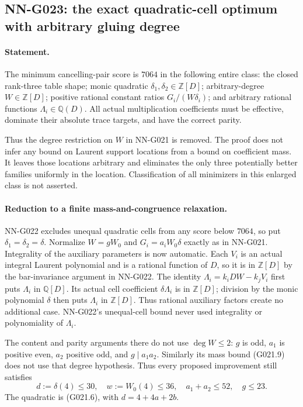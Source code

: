 \subsection{NN-G023: the exact quadratic-cell optimum with arbitrary gluing degree}
\paragraph{Statement.}
The minimum cancelling-pair score is $7064$ in the following
entire class: the closed rank-three table shape; monic quadratic
$\delta_1,\delta_2\in\mathbb Z[D]$; arbitrary-degree
$W\in\mathbb Z[D]$; positive rational constant ratios
$G_i/(W\delta_i)$; and arbitrary rational functions
$\Lambda_i\in\mathbb Q(D)$. All actual multiplication
coefficients must be effective, dominate their absolute trace
targets, and have the correct parity.

Thus the degree restriction on $W$ in NN-G021 is removed.
The proof does not infer any bound on Laurent support locations
from a bound on coefficient mass. It leaves those locations
arbitrary and eliminates the only three potentially better
families uniformly in the location. Classification of all
minimizers in this enlarged class is not asserted.

\paragraph{Reduction to a finite mass-and-congruence relaxation.}
NN-G022 excludes unequal quadratic cells from any score below
$7064$, so put $\delta_1=\delta_2=\delta$. Normalize
$W=gW_0$ and $G_i=a_iW_0\delta$ exactly as in NN-G021.
Integrality of the auxiliary parameters is now automatic.
Each $V_i$ is an actual integral Laurent polynomial and
is a rational function of $D$, so it is in $\mathbb Z[D]$
by the bar-invariance argument in NN-G022. The identity
$\Lambda_i=k_iDW-k_jV_i$ first puts $\Lambda_i$ in
$\mathbb Q[D]$. Its actual cell coefficient
$\delta\Lambda_i$ is in $\mathbb Z[D]$; division by the
monic polynomial $\delta$ then puts $\Lambda_i$ in
$\mathbb Z[D]$. Thus rational auxiliary factors create
no additional case. NN-G022's unequal-cell bound never
used integrality or polynomiality of $\Lambda_i$.

The content and parity arguments there do not use $\deg W\le2$:
$g$ is odd, $a_1$ is positive even, $a_2$ positive odd,
and $g\mid a_1a_2$. Similarly its mass bound (G021.9)
does not use that degree hypothesis. Thus every proposed
improvement still satisfies
\[
 d:=\delta(4)\le30,\quad w:=W_0(4)\le36,
 \quad a_1+a_2\le52,\quad g\le23.
 \tag{G023.1}
\]
The quadratic is (G021.6), with $d=4+4a+2b$.

